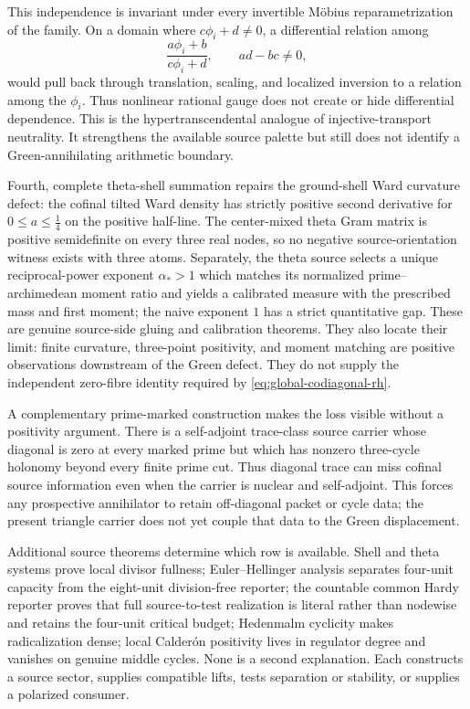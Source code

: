 \documentclass[11pt]{article}
\theoremstyle{definition}
\theoremstyle{remark}
\begin{document}
This independence is invariant under every invertible M\"obius
reparametrization of the family.  On a domain where
\(c\phi_i+d\ne0\), a differential relation among
\[
                 \frac{a\phi_i+b}{c\phi_i+d},
                 \qquad ad-bc\ne0,
\tag{6.9c}\label{eq:mobius-hypertranscendence-gauge}
\]
would pull back through translation, scaling, and localized inversion to a
relation among the \(\phi_i\).  Thus nonlinear rational gauge does not create
or hide differential dependence.  This is the hypertranscendental analogue
of injective-transport neutrality.  It strengthens the available source
palette but still does not identify a Green-annihilating arithmetic
boundary.

Fourth, complete theta-shell summation repairs the ground-shell Ward
curvature defect: the cofinal tilted Ward density has strictly positive
second derivative for \(0\le a\le\tfrac14\) on the positive half-line.
The center-mixed theta Gram matrix is positive semidefinite on every three
real nodes, so no negative source-orientation witness exists with three
atoms.  Separately, the theta source selects a unique reciprocal-power
exponent \(\alpha_*>1\) which matches its normalized prime--archimedean
moment ratio and yields a calibrated measure with the prescribed mass and
first moment; the naive exponent \(1\) has a strict quantitative gap.
These are genuine source-side gluing and calibration theorems.  They also
locate their limit: finite curvature, three-point positivity, and moment
matching are positive observations downstream of the Green defect.  They do
not supply the independent zero-fibre identity required by
\eqref{eq:global-codiagonal-rh}.

A complementary prime-marked construction makes the loss visible without a
positivity argument.  There is a self-adjoint trace-class source carrier
whose diagonal is zero at every marked prime but which has nonzero
three-cycle holonomy beyond every finite prime cut.  Thus diagonal trace can
miss cofinal source information even when the carrier is nuclear and
self-adjoint.  This forces any prospective annihilator to retain
off-diagonal packet or cycle data; the present triangle carrier does not yet
couple that data to the Green displacement.

Additional source theorems determine which row is available.  Shell and
theta systems prove local divisor fullness; Euler--Hellinger analysis
separates four-unit capacity from the eight-unit division-free reporter;
the countable common Hardy reporter proves that full source-to-test
realization is literal rather than nodewise and retains the four-unit
critical budget; Hedenmalm cyclicity makes
radicalization dense; local Calder\'on positivity lives in regulator degree
and vanishes on genuine middle cycles.  None is a second explanation.  Each
constructs a source sector, supplies compatible lifts, tests separation or
stability, or supplies a polarized consumer.
\end{document}
